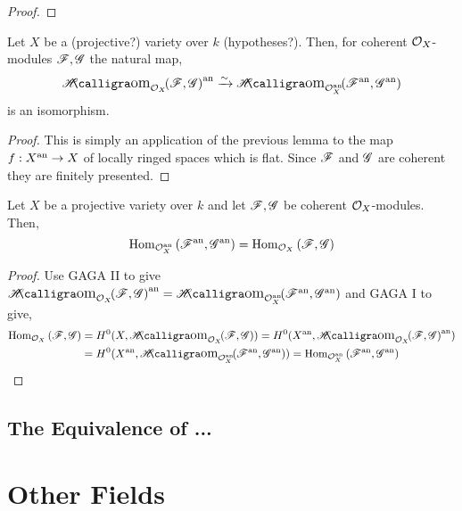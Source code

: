 \documentclass[12pt]{article}
\begin{document}
\begin{proof}

\end{proof}

\begin{theorem}[GAGA II]
Let $X$ be a (projective?) variety over $k$ (hypotheses?). Then, for coherent $\mathcal{O}_{X}$-modules $\mathscr{F}, \mathscr{G}$ the natural map,
\[ \shHom{\struct{X}}{\F}{\G}^\an \xrightarrow{\sim} \shHom{\struct{X}^\an}{\F^\an}{\G^\an} \]
is an isomorphism.
\end{theorem}

\begin{proof}
This is simply an application of the previous lemma to the map $f : X^{\mathrm{an}} \to X$ of locally ringed spaces which is flat. Since $\mathscr{F}$ and $\mathscr{G}$ are coherent they are finitely presented.
\end{proof}

\begin{corollary}
Let $X$ be a projective variety over $k$ and let $\mathscr{F}, \mathscr{G}$ be coherent $\mathcal{O}_{X}$-modules. Then,
\[ \mathrm{Hom}_{\mathcal{O}_{X}^{\mathrm{an}}} \left( \mathscr{F}^{\mathrm{an}}, \mathscr{G}^{\mathrm{an}} \right) = \mathrm{Hom}_{\mathcal{O}_{X}} \left( \mathscr{F}, \mathscr{G} \right) \]
\end{corollary}

\begin{proof}
Use GAGA II to give $\shHom{\struct{X}}{\F}{\G}^\an = \shHom{\struct{X}^\an}{\F^\an}{\G^\an}$ and GAGA I to give,
\begin{align*}
\Hom{\struct{X}}{\F}{\G} & = H^0(X, \shHom{\struct{X}}{\F}{\G}) = H^0(X^\an, \shHom{\struct{X}}{\F}{\G}^\an)
\\
& = H^0(X^\an, \shHom{\struct{X}^\an}{\F^\an}{\G^\an}) = \Hom{\struct{X}^\an}{\F^\an}{\G^\an}
\end{align*}
\end{proof}

\subsection{The Equivalence of ...}

\section{Other Fields}
\end{document}

